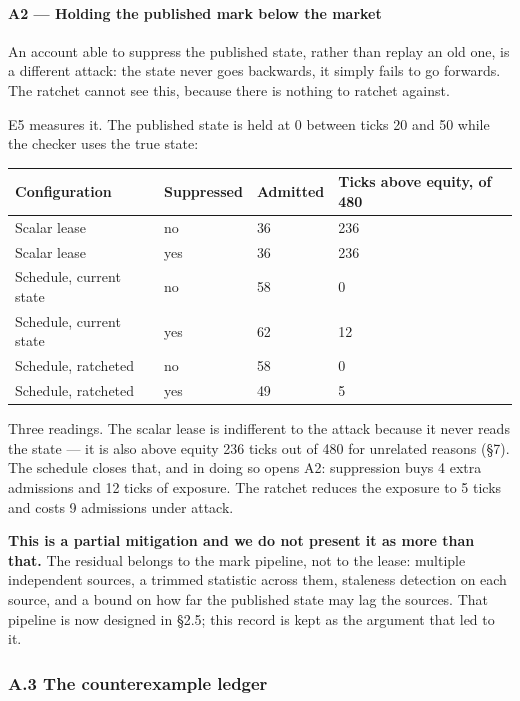 \documentclass[10pt,a4paper]{article}
\newcounter{none}  %
\begin{document}
\paragraph{A2 --- Holding the published mark below the market}\label{a2-holding-the-published-mark-below-the-market}

An account able to suppress the published state, rather than replay an old one,
is a different attack: the state never goes backwards, it simply fails to go
forwards. The ratchet cannot see this, because there is nothing to ratchet
against.

E5 measures it. The published state is held at 0 between ticks 20 and 50 while
the checker uses the true state:

{\def\LTcaptype{none} %
\begin{longtable}[]{@{}llll@{}}
\toprule\noalign{}
Configuration & Suppressed & Admitted & Ticks above equity, of 480 \\
\midrule\noalign{}
\endhead
\bottomrule\noalign{}
\endlastfoot
Scalar lease & no & 36 & 236 \\
Scalar lease & yes & 36 & 236 \\
Schedule, current state & no & 58 & 0 \\
Schedule, current state & yes & 62 & 12 \\
Schedule, ratcheted & no & 58 & 0 \\
Schedule, ratcheted & yes & 49 & 5 \\
\end{longtable}
}

Three readings. The scalar lease is indifferent to the attack because it never
reads the state --- it is also above equity 236 ticks out of 480 for unrelated
reasons (§7). The schedule closes that, and in doing so opens A2: suppression
buys 4 extra admissions and 12 ticks of exposure. The ratchet reduces the
exposure to 5 ticks and costs 9 admissions under attack.

\textbf{This is a partial mitigation and we do not present it as more than that.} The
residual belongs to the mark pipeline, not to the lease: multiple independent
sources, a trimmed statistic across them, staleness detection on each source,
and a bound on how far the published state may lag the sources. That pipeline is
now designed in §2.5; this record is kept as the argument that led to it.

\subsubsection{A.3 The counterexample ledger}\label{a.3-the-counterexample-ledger}
\end{document}
